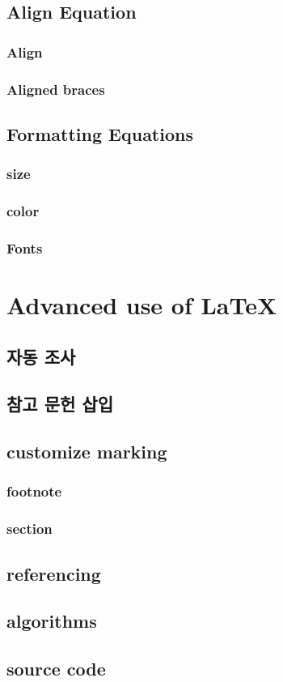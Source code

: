 \documentclass[12pt]{article}
\begin{document}
	\subsection{Align Equation}
	\subsubsection{Align}
	\subsubsection{Aligned braces}
	\subsection{Formatting Equations}
	\subsubsection{size}
	\subsubsection{color}
	\subsubsection{Fonts}
	\section{Advanced use of \LaTeX}
	\subsection{자동 조사}
	\subsection{참고 문헌 삽입}
	\subsection{customize marking}
	\subsubsection{footnote}
	\subsubsection{section}
	\subsection{referencing}
	\subsection{algorithms}
	\subsection{source code}
\end{document}
